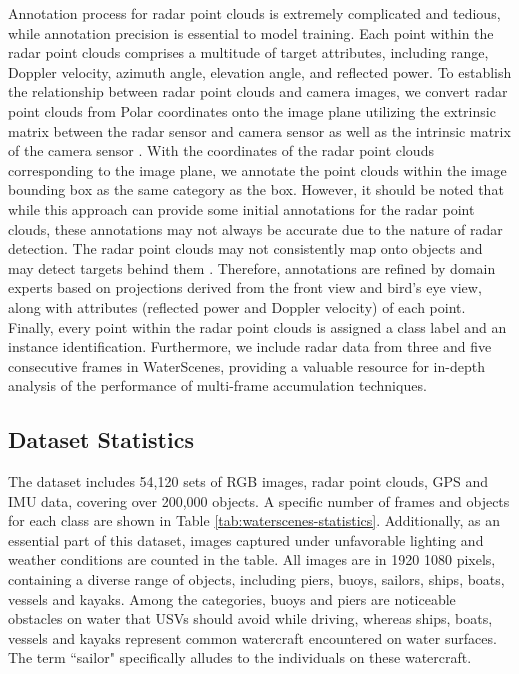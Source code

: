 \documentclass[lettersize,journal]{IEEEtran}
\begin{document}
Annotation process for radar point clouds is extremely complicated and tedious, while annotation precision is essential to model training. 
Each point within the radar point clouds comprises a multitude of target attributes, including range, Doppler velocity, azimuth angle, elevation angle, and reflected power.
To establish the relationship between radar point clouds and camera images, we convert radar point clouds from Polar coordinates onto the image plane utilizing the extrinsic matrix between the radar sensor and camera sensor as well as the intrinsic matrix of the camera sensor \cite{domhof2021joint}.
With the coordinates of the radar point clouds corresponding to the image plane, we annotate the point clouds within the image bounding box as the same category as the box.
However, it should be noted that while this approach can provide some initial annotations for the radar point clouds, these annotations may not always be accurate due to the nature of radar detection. 
The radar point clouds may not consistently map onto objects and may detect targets behind them \cite{meyer2019deep, stacker2022fusion}. Therefore, annotations are refined by domain experts based on projections derived from the front view and bird's eye view, along with attributes (reflected power and Doppler velocity) of each point. 
Finally, every point within the radar point clouds is assigned a class label and an instance identification.
Furthermore, we include radar data from three and five consecutive frames in WaterScenes, providing a valuable resource for in-depth analysis of the performance of multi-frame accumulation techniques.

\subsection{Dataset Statistics}

The dataset includes 54,120 sets of RGB images, radar point clouds, GPS and IMU data, covering over 200,000 objects. A specific number of frames and objects for each class are shown in Table \ref{tab:waterscenes-statistics}. Additionally, as an essential part of this dataset, images captured under unfavorable lighting and weather conditions are counted in the table. All images are in 1920  1080 pixels, containing a diverse range of objects, including piers, buoys, sailors, ships, boats, vessels and kayaks. Among the categories, buoys and piers are noticeable obstacles on water that USVs should avoid while driving, whereas ships, boats, vessels and kayaks represent common watercraft encountered on water surfaces. The term ``sailor" specifically alludes to the individuals on these watercraft.
\end{document}
